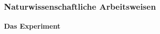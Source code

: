 \begin{frame}
  \frametitle{Naturwissenschaftliche Arbeitsweisen}
  \framesubtitle{Das Experiment}
  \parbox[t]{0.3\linewidth}{
    \\
}
\end{frame}
